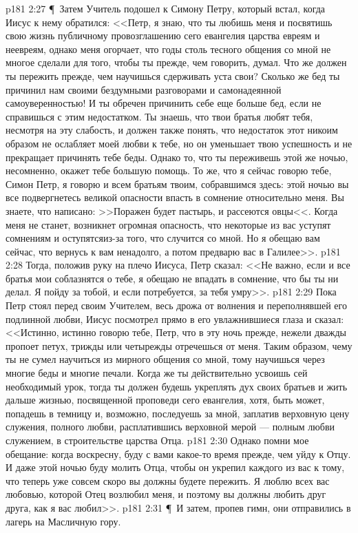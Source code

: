 \vs p181 2:27 \P\ Затем Учитель подошел к Симону Петру, который встал, когда Иисус к нему обратился: <<Петр, я знаю, что ты любишь меня и посвятишь свою жизнь публичному провозглашению сего евангелия царства евреям и неевреям, однако меня огорчает, что годы столь тесного общения со мной не многое сделали для того, чтобы ты прежде, чем говорить, думал. Что же должен ты пережить прежде, чем научишься сдерживать уста свои? Сколько же бед ты причинил нам своими бездумными разговорами и самонадеянной самоуверенностью! И ты обречен причинить себе еще больше бед, если не справишься с этим недостатком. Ты знаешь, что твои братья любят тебя, несмотря на эту слабость, и должен также понять, что недостаток этот никоим образом не ослабляет моей любви к тебе, но он уменьшает твою успешность и не прекращает причинять тебе беды. Однако то, что ты переживешь этой же ночью, несомненно, окажет тебе большую помощь. То же, что я сейчас говорю тебе, Симон Петр, я говорю и всем братьям твоим, собравшимся здесь: этой ночью вы все подвергнетесь великой опасности впасть в сомнение относительно меня. Вы знаете, что написано: >>Поражен будет пастырь, и рассеются овцы<<. Когда меня не станет, возникнет огромная опасность, что некоторые из вас уступят сомнениям и оступятсяиз\hyp{}за того, что случится со мной. Но я обещаю вам сейчас, что вернусь к вам ненадолго, а потом предварю вас в Галилее>>.
\vs p181 2:28 Тогда, положив руку на плечо Иисуса, Петр сказал: <<Не важно, если и все братья мои соблазнятся о тебе, я обещаю не впадать в сомнение, что бы ты ни делал. Я пойду за тобой, и если потребуется, за тебя умру>>.
\vs p181 2:29 Пока Петр стоял перед своим Учителем, весь дрожа от волнения и переполнявшей его подлинной любви, Иисус посмотрел прямо в его увлажнившиеся глаза и сказал: <<Истинно, истинно говорю тебе, Петр, что в эту ночь прежде, нежели дважды пропоет петух, трижды или четырежды отречешься от меня. Таким образом, чему ты не сумел научиться из мирного общения со мной, тому научишься через многие беды и многие печали. Когда же ты действительно усвоишь сей необходимый урок, тогда ты должен будешь укреплять дух своих братьев и жить дальше жизнью, посвященной проповеди сего евангелия, хотя, быть может, попадешь в темницу и, возможно, последуешь за мной, заплатив верховную цену служения, полного любви, расплатившись верховной мерой --- полным любви служением, в строительстве царства Отца.
\vs p181 2:30 Однако помни мое обещание: когда воскресну, буду с вами какое\hyp{}то время прежде, чем уйду к Отцу. И даже этой ночью буду молить Отца, чтобы он укрепил каждого из вас к тому, что теперь уже совсем скоро вы должны будете пережить. Я люблю всех вас любовью, которой Отец возлюбил меня, и поэтому вы должны любить друг друга, как я вас любил>>.
\vs p181 2:31 \P\ И затем, пропев гимн, они отправились в лагерь на Масличную гору.
